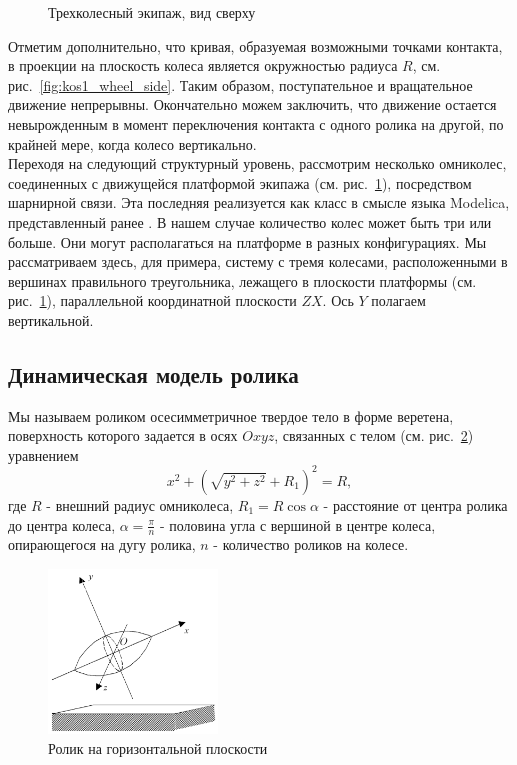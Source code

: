 \documentclass[12pt]{article}
\begin{document}
\begin{figure}
\begin{minipage}{.47\textwidth}
    \caption{Трехколесный экипаж, вид сверху}
    \label{fig:kos2_vehicle}
\end{minipage}
\end{figure}


Отметим дополнительно, что кривая, образуемая возможными точками контакта, в проекции на плоскость колеса является окружностью радиуса $R$, см. рис.~\ref{fig:kos1_wheel_side}. Таким образом, поступательное и вращательное движение непрерывны. Окончательно можем заключить, что движение остается невырожденным в момент переключения контакта с одного ролика на другой, по крайней мере, когда колесо вертикально.\\

Переходя на следующий структурный уровень, рассмотрим несколько омниколес, соединенных с движущейся платформой экипажа (см. рис.~\ref{fig:kos2_vehicle}), посредством шарнирной связи. Эта последняя реализуется как класс в смысле языка Modelica, представленный ранее \cite{kos5}. В нашем случае количество колес может быть три или больше. Они могут располагаться на платформе в разных конфигурациях. Мы рассматриваем здесь, для примера, систему с тремя колесами, расположенными в вершинах правильного треугольника, лежащего в плоскости платформы (см. рис.~\ref{fig:kos2_vehicle}), параллельной координатной плоскости $ZX$. Ось $Y$ полагаем вертикальной.\\

\subsection{Динамическая модель ролика}

Мы называем роликом осесимметричное твердое тело в форме веретена, поверхность которого задается в осях $Oxyz$, связанных с телом (см. рис.~\ref{fig:kos3_roller_frame}) уравнением
\begin{equation}
    x^2 + (\sqrt{y^2+z^2} + R_1)^2 = R,
\end{equation}
где $R$ - внешний радиус омниколеса, $R_1 = R\cos\alpha$ - расстояние от центра ролика до центра колеса, $\alpha = \frac{\pi}{n}$ - половина угла с вершиной в центре колеса, опирающегося на дугу ролика, $n$ - количество роликов на колесе.\\

\begin{figure}[h]
    \centering
    \includegraphics[width=0.4\textwidth]{content/parts/3_friction/diploma/img/art/kos3_roller_frame.png}
    \caption{Ролик на горизонтальной плоскости}
    \label{fig:kos3_roller_frame}
\end{figure}
\end{document}
